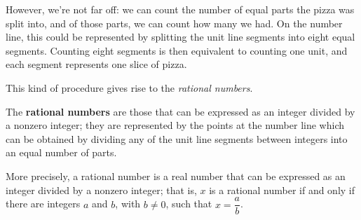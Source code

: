 However, we're not far off: we can count the number of equal parts the pizza was split into, and of those parts, we can count how many we had. On the number line, this could be represented by splitting the unit line segments into eight equal segments. Counting eight segments is then equivalent to counting one unit, and each segment represents one slice of pizza.

\begin{center}
\end{center}

This kind of procedure gives rise to the \textit{rational numbers}.
\begin{definition}
\label{defRationalNumberInformal}
The \textbf{rational numbers} are those that can be expressed as an integer divided by a nonzero integer; they are represented by the points at the number line which can be obtained by dividing any of the unit line segments between integers into an equal number of parts.
\begin{center}
\end{center}
More precisely, a rational number is a real number that can be expressed as an integer divided by a nonzero integer; that is, $x$ is a rational number if and only if there are integers $a$ and $b$, with $b \ne 0$, such that $x = \dfrac{a}{b}$.
\end{definition}

